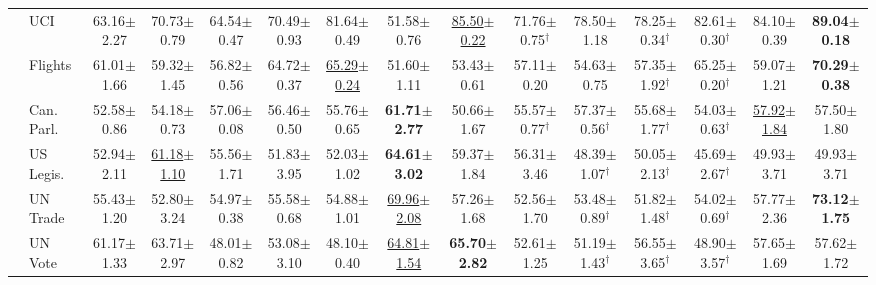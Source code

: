 \begin{table}[t]
{\begin{tabular}{llccccccccccccc}
 & UCI & 63.16{\scriptsize$\pm$2.27} & 70.73{\scriptsize$\pm$0.79} & 64.54{\scriptsize$\pm$0.47} & 70.49{\scriptsize$\pm$0.93} & 81.64{\scriptsize$\pm$0.49} & 51.58{\scriptsize$\pm$0.76} & \underline{85.50{\scriptsize$\pm$0.22}} & 71.76{\scriptsize$\pm$0.75}$^\dagger$ & 78.50{\scriptsize$\pm$1.18} & 78.25{\scriptsize$\pm$0.34}$^\dagger$ & 82.61{\scriptsize$\pm$0.30}$^\dagger$ & 84.10{\scriptsize$\pm$0.39} & \textbf{89.04{\scriptsize$\pm$0.18}} \\
 & Flights & 61.01{\scriptsize$\pm$1.66} & 59.32{\scriptsize$\pm$1.45} & 56.82{\scriptsize$\pm$0.56} & 64.72{\scriptsize$\pm$0.37} & \underline{65.29{\scriptsize$\pm$0.24}} & 51.60{\scriptsize$\pm$1.11} & 53.43{\scriptsize$\pm$0.61} & 57.11{\scriptsize$\pm$0.20} & 54.63{\scriptsize$\pm$0.75} & 57.35{\scriptsize$\pm$1.92}$^\dagger$ & 65.25{\scriptsize$\pm$0.20}$^\dagger$ & 59.07{\scriptsize$\pm$1.21} & \textbf{70.29{\scriptsize$\pm$0.38}} \\
 & Can. Parl. & 52.58{\scriptsize$\pm$0.86} & 54.18{\scriptsize$\pm$0.73} & 57.06{\scriptsize$\pm$0.08} & 56.46{\scriptsize$\pm$0.50} & 55.76{\scriptsize$\pm$0.65} & \textbf{61.71{\scriptsize$\pm$2.77}} & 50.66{\scriptsize$\pm$1.67} & 55.57{\scriptsize$\pm$0.77}$^\dagger$ & 57.37{\scriptsize$\pm$0.56}$^\dagger$ & 55.68{\scriptsize$\pm$1.77}$^\dagger$ & 54.03{\scriptsize$\pm$0.63}$^\dagger$ & \underline{57.92{\scriptsize$\pm$1.84}} & 57.50{\scriptsize$\pm$1.80} \\
 & US Legis. & 52.94{\scriptsize$\pm$2.11} & \underline{61.18{\scriptsize$\pm$1.10}} & 55.56{\scriptsize$\pm$1.71} & 51.83{\scriptsize$\pm$3.95} & 52.03{\scriptsize$\pm$1.02} & \textbf{64.61{\scriptsize$\pm$3.02}} & 59.37{\scriptsize$\pm$1.84} & 56.31{\scriptsize$\pm$3.46} & 48.39{\scriptsize$\pm$1.07}$^\dagger$ & 50.05{\scriptsize$\pm$2.13}$^\dagger$ & 45.69{\scriptsize$\pm$2.67}$^\dagger$ & 49.93{\scriptsize$\pm$3.71} & 49.93{\scriptsize$\pm$3.71} \\
 & UN Trade & 55.43{\scriptsize$\pm$1.20} & 52.80{\scriptsize$\pm$3.24} & 54.97{\scriptsize$\pm$0.38} & 55.58{\scriptsize$\pm$0.68} & 54.88{\scriptsize$\pm$1.01} & \underline{69.96{\scriptsize$\pm$2.08}} & 57.26{\scriptsize$\pm$1.68} & 52.56{\scriptsize$\pm$1.70} & 53.48{\scriptsize$\pm$0.89}$^\dagger$ & 51.82{\scriptsize$\pm$1.48}$^\dagger$ & 54.02{\scriptsize$\pm$0.69}$^\dagger$ & 57.77{\scriptsize$\pm$2.36} & \textbf{73.12{\scriptsize$\pm$1.75}} \\
 & UN Vote & 61.17{\scriptsize$\pm$1.33} & 63.71{\scriptsize$\pm$2.97} & 48.01{\scriptsize$\pm$0.82} & 53.08{\scriptsize$\pm$3.10} & 48.10{\scriptsize$\pm$0.40} & \underline{64.81{\scriptsize$\pm$1.54}} & \textbf{65.70{\scriptsize$\pm$2.82}} & 52.61{\scriptsize$\pm$1.25} & 51.19{\scriptsize$\pm$1.43}$^\dagger$ & 56.55{\scriptsize$\pm$3.65}$^\dagger$ & 48.90{\scriptsize$\pm$3.57}$^\dagger$ & 57.65{\scriptsize$\pm$1.69} & 57.62{\scriptsize$\pm$1.72} \\

\end{tabular}}
\end{table}
